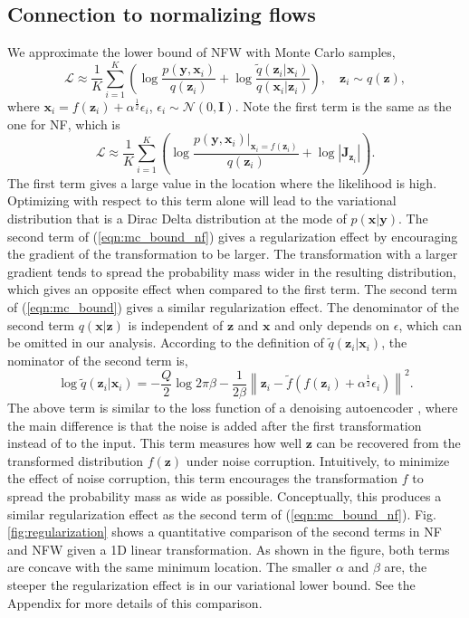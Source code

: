 \documentclass{article}
\newcommand{\yV}{\mathbf{y}}
\newcommand{\xV}{\mathbf{x}}
\newcommand{\zV}{\mathbf{z}}
\newcommand{\bound}{\mathcal{L}}
\newcommand{\I}{\mathbf{I}}
\newcommand{\J}{\mathbf{J}}
\newcommand{\acr}[1]{\textsc{#1}\xspace}
\newcommand{\us}{\acr{NFW}}
\begin{document}
\subsection{Connection to normalizing flows}

We approximate  the lower bound of \us  with Monte Carlo samples,
\begin{equation}
\bound \approx \frac{1}{K} \sum_{i=1}^K\left( \log \frac{p(\yV, \xV_i) }{q(\zV_i)}+  \log \frac{\tilde{q}(\zV_i | \xV_i)}{q(\xV_i|\zV_i)}  \right) , \quad \zV_i \sim q(\zV), \label{eqn:mc_bound}
\end{equation}
where $\xV_i = f(\zV_i) + \alpha^{\frac{1}{2}} \epsilon_i$, $\epsilon_i \sim \mathcal{N}(0, \I)$. Note the first term is the same as the one for NF, which is 
\begin{equation}
\bound \approx \frac{1}{K} \sum_{i=1}^K   \left(\log \frac{p(\yV, \xV_i)|_{\xV_i = f(\zV_i)} }{q(\zV_i)}+  \log \left| \J_{\zV_i} \right| \right). \label{eqn:mc_bound_nf}
\end{equation}
The first term gives a large value in the location where the likelihood is high. Optimizing with respect to this term alone will lead to the variational distribution that is a Dirac Delta distribution at the mode of $p(\xV | \yV)$. The second term of (\ref{eqn:mc_bound_nf}) gives a regularization effect by encouraging the gradient of the transformation to be larger. The transformation with a larger gradient tends to spread the probability mass wider in the resulting distribution, which gives an opposite effect when compared to the first term. 
%
The second term of (\ref{eqn:mc_bound}) gives a similar regularization effect. The denominator of the second term $q(\xV|\zV)$ is independent of $\zV$ and $\xV$ and only depends on $\epsilon$, which can be omitted in our analysis. According to the definition of $\tilde{q}(\zV_i | \xV_i)$, the nominator of the second term is,
\begin{equation}
\log \tilde{q}(\zV_i | \xV_i) = -\frac{Q}{2}\log 2\pi \beta  - \frac{1}{2\beta} \left\|\zV_i-\tilde{f}(f(\zV_i) + \alpha^{\frac{1}{2}} \epsilon_i)\right\|^2. \label{eqn:regularization_term}
\end{equation}
%
The above term is similar to the loss function of a denoising autoencoder \citep{VincentEtAl2008}, where the main difference is that the noise is added after the first transformation instead of to the input. This term measures how well $\zV$ can be recovered from the transformed distribution $f(\zV)$ under noise corruption. Intuitively, to minimize the effect of noise corruption, this term encourages the transformation $f$ to spread the probability mass as wide as possible. Conceptually, this produces a similar regularization effect as the second term of (\ref{eqn:mc_bound_nf}).
%
Fig.\,\ref{fig:regularization} shows a quantitative comparison of the second terms in NF and \us given a 1D linear transformation. As shown in the figure, both terms are concave with the same minimum location. The smaller $\alpha$ and $\beta$ are, the steeper the regularization effect is in our variational lower bound. See the Appendix for more details of this comparison.
\end{document}
